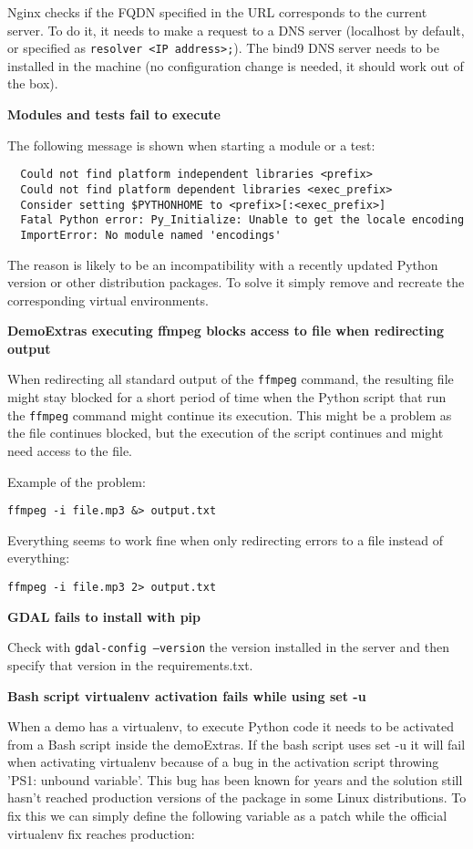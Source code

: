 \documentclass[a4paper,12pt]{article}
\begin{document}
Nginx checks if the FQDN specified in the URL corresponds to the current server. To do it, it needs to make a request to a DNS server (localhost by default, or specified as {\tt resolver <IP address>;}). The bind9 DNS server needs to be installed in the machine (no configuration change is needed, it should work out of the box).
\vspace{0.5cm}

\textbf{Modules and tests fail to execute}

The following message is shown when starting a module or a test:

\begin{verbatim}  
  Could not find platform independent libraries <prefix>
  Could not find platform dependent libraries <exec_prefix>
  Consider setting $PYTHONHOME to <prefix>[:<exec_prefix>]
  Fatal Python error: Py_Initialize: Unable to get the locale encoding
  ImportError: No module named 'encodings'
\end{verbatim}

The reason is likely to be an incompatibility with a recently updated Python version or other distribution packages. To solve it simply remove and recreate the corresponding virtual environments.

\textbf{DemoExtras executing ffmpeg blocks access to file when redirecting output}

When redirecting all standard output of the {\tt ffmpeg} command, the resulting file might stay blocked for a short period of time when the Python script that run the {\tt ffmpeg} command might continue its execution. This might be a problem as the file continues blocked, but the execution of the script continues and might need access to the file.

Example of the problem:

{\tt ffmpeg -i file.mp3 \&> output.txt}

Everything seems to work fine when only redirecting errors to a file instead of everything:

{\tt ffmpeg -i file.mp3 2> output.txt}

\textbf{GDAL fails to install with pip}

Check with {\tt gdal-config --version} the version installed in the server and then specify that version in the requirements.txt.

\textbf{Bash script virtualenv activation fails while using set -u}

When a demo has a virtualenv, to execute Python code it needs to be activated from a Bash script inside the demoExtras. If the bash script uses set -u it will fail when activating virtualenv because of a bug in the activation script throwing 'PS1: unbound variable'. This bug has been known for years and the solution still hasn't reached production versions of the package in some Linux distributions. To fix this we can simply define the following variable as a patch while the official virtualenv fix reaches production:
\end{document}
